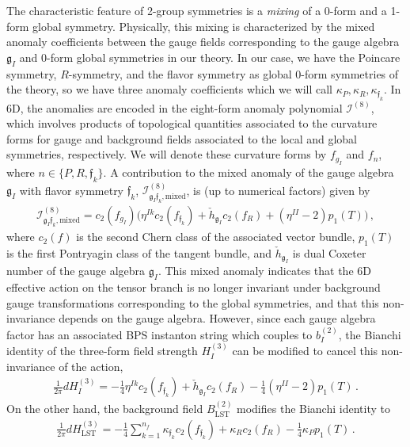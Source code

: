 \documentclass[11pt]{article}
\numberwithin{equation}{section}
\newcommand{\LST}{\text{LST}\xspace}
\begin{document}
The characteristic feature of 2-group symmetries is a \textit{mixing} of a 0-form and a 1-form global symmetry. Physically, this mixing is characterized by the mixed anomaly coefficients between the gauge fields corresponding to the gauge algebra $\mathfrak{g}_{I}$ and 0-form global symmetries in our theory. In our case, we have the Poincare symmetry, $R$-symmetry, and the flavor symmetry as global 0-form symmetries of the theory, so we have three anomaly coefficients which we will call $\kappa_{P},\kappa_{R}, \kappa_{\mathfrak{f}_{k}}$. In 6D, the anomalies are encoded in the eight-form anomaly polynomial $\mathcal{I}^{(8)}$, which involves products of topological quantities associated to the curvature forms for gauge and background fields associated to the local and global symmetries, respectively. We will denote these curvature forms by $f_{g_{I}}$ and $f_{n}$, where $n \in \{P,R,\mathfrak{f}_{k}\}$. A contribution to the mixed anomaly of the gauge algebra $\mathfrak{g}_{I}$ with flavor symmetry $\mathfrak{f}_{k}$, $\mathcal{I}^{(8)}_{\mathfrak{g}_{I}\mathfrak{f}_{k},\text{mixed}}$, is (up to numerical factors) given by~\cite{Cordova:2020tij}
\begin{align}
\label{mixed}
\mathcal{I}^{(8)}_{\mathfrak{g}_{I}\mathfrak{f}_{k},\text{mixed}}=c_{2}(f_{g_{I}})\bigg(\eta^{Ik}c_{2}(f_{\mathfrak{f}_{k}})+\check{h}_{\mathfrak{g}_{I}}c_{2}(f_{R}) + (\eta^{II}-2)p_{1}(T)\bigg)\,,
\end{align}
where $c_{2}(f)$ is the second Chern class of the associated vector bundle, $p_{1}(T)$ is the first Pontryagin class of the tangent bundle, and $\check{h}_{\mathfrak{g}_{I}}$ is dual Coxeter number of the gauge algebra $\mathfrak{g}_{I}$. This mixed anomaly indicates that the 6D effective action on the tensor branch is no longer invariant under background gauge transformations corresponding to the global symmetries, and that this non-invariance depends on the gauge algebra\cite{Cordova:2020tij}. However, since each gauge algebra factor has an associated BPS instanton string which couples to $b_{I}^{(2)}$, the Bianchi identity of the three-form field strength $H_{I}^{(3)}$ can be modified to cancel this non-invariance of the action,
\begin{align}
\frac{1}{2\pi}dH^{(3)}_{I}=-\frac{1}{4}\eta^{Ik}c_{2}(f_{\mathfrak{f}_{k}})+\check{h}_{\mathfrak{g}_{I}}c_{2}(f_{R})  - \frac{1}{4}(\eta^{II}-2)p_{1}(T)\,.
\end{align}
On the other hand, the background field $B^{(2)}_{\LST}$ modifies the Bianchi identity to
\begin{align}
\label{eq:dHLST}
\frac{1}{2\pi}dH^{(3)}_{\LST}=-\frac{1}{4}\sum_{k=1}^{n_{f}}\kappa_{\mathfrak{f}_{k}}c_{2}(f_{\mathfrak{f}_{k}})+\kappa_{R}c_{2}(f_{R}) - \frac{1}{4}\kappa_{P}p_{1}(T)\,.
\end{align}
\end{document}
